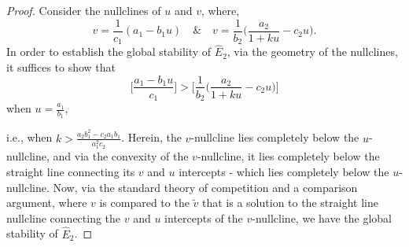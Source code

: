 \documentclass[10pt]{amsart}
\theoremstyle{definition}
\begin{document}
\begin{proof}
	Consider the nullclines of $u$ and $v$, where,
	\[ v = \dfrac{1}{c_1}  (a_1 -b_1 u) \quad \& \quad v = \dfrac{1}{b_2} \Big( \dfrac{a_2}{1+ k u} -c_2 u \Big). \]
	In order to establish the global stability of $\widehat{E}_2$, via the geometry of the nullclines, it suffices to show that 
	\[  \Big[ \dfrac{a_1-b_1 u}{c_1} \Big] > \Big[ \dfrac{1}{b_2} \Big( \dfrac{a_2}{1+ k u} - c_2 u \Big)\Big]  \]
	when $u=\frac{a_1}{b_{1}}$,
	
	i.e., when $k>\frac{a_2 b_1^2-c_2a_1b_1}{a_1^2c_2}$. Herein, the $v$-nullcline lies completely below the $u$-nullcline, and via the convexity of the $v$-nullcline, it lies completely below the straight line connecting its $v$ and $u$ intercepts - which lies completely below the $u$-nullcline.
	Now, via the standard theory of competition and a comparison argument, where $v$ is compared to the $\tilde{v}$ that is a solution to the straight line nullcline connecting the $v$ and $u$ intercepts of the $v$-nullcline, we have the global stability of $\widehat{E}_2$.
\end{proof}








%
\end{document}
